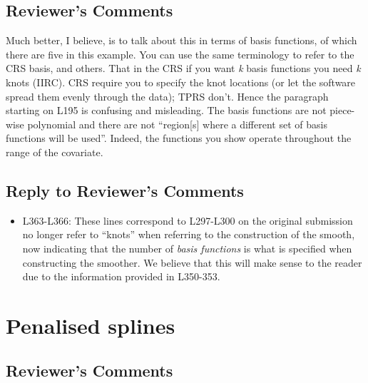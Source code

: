 \documentclass[
]{article}
\providecommand{\tightlist}{%
  \setlength{\itemsep}{0pt}\setlength{\parskip}{0pt}}
\begin{document}
\hypertarget{reviewers-comments-4}{%
\subsection{Reviewer's Comments}\label{reviewers-comments-4}}

Much better, I believe, is to talk about this in terms of basis functions, of which there are five in this example. You can use the same terminology to refer to the CRS basis, and others. That in the CRS if you want \emph{k} basis functions you need \emph{k} knots (IIRC). CRS require you to specify the knot locations (or let the software spread them evenly through the data); TPRS don't.
Hence the paragraph starting on L195 is confusing and misleading. The basis functions are not piece-wise polynomial and there are not ``region{[}s{]} where a different set of basis functions will be used''. Indeed, the functions you show operate throughout the range of the covariate.

\hypertarget{section-5}{%
\subsection{\texorpdfstring{\textcolor{reviewersblue} {Reply to Reviewer's Comments}}{}}\label{section-5}}

\begin{itemize}
\tightlist
\item
  L363-L366: These lines correspond to L297-L300 on the original submission no longer refer to ``knots'' when referring to the construction of the smooth, now indicating that the number of \emph{basis functions} is what is specified when constructing the smoother. We believe that this will make sense to the reader due to the information provided in L350-353.
\end{itemize}

\hypertarget{penalised-splines}{%
\section{Penalised splines}\label{penalised-splines}}

\hypertarget{reviewers-comments-5}{%
\subsection{Reviewer's Comments}\label{reviewers-comments-5}}
\end{document}
